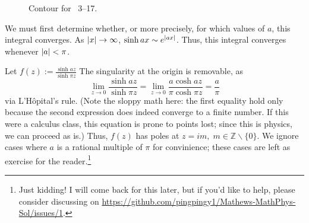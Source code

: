 \item

\begin{figure}[h]
	\centering
	\caption{Contour for ~3--17.}%
	\label{fig:problem3-17}
\end{figure}

We must first determine whether, or more precisely, for which values of $a$, this integral converges.
As $\left| x \right| \rightarrow \infty$, $\sinh ax \sim e^{\left| ax \right|}$.
Thus, this integral converges whenever $\left| a \right| < \pi$.

Let $f(z) := \frac{\sinh az}{\sinh \pi z}$
The singularity at the origin is removable, as
\[
    \lim_{z \rightarrow 0} \frac{\sinh az}{\sinh \pi z}
    = \lim_{z \rightarrow 0} \frac{a \cosh az}{\pi \cosh \pi z}
    = \frac{a}{\pi}
\]
via L'H\^opital's rule.
(Note the sloppy math here:
the first equality hold only because the second expression does indeed converge to a finite number.
If this were a calculus class, this equation is prone to points lost;
since this is physics, we can proceed as is.)
Thus, $f(z)$ has poles at $z = im,\; m \in \mathbb{Z} \backslash \{0\}$.
We ignore cases where $a$ is a rational multiple of $\pi$ for convinience;
these cases are left as exercise for the reader.\footnote{
Just kidding!
I will come back for this later, but if you'd like to help,
please consider discussing on \url{https://github.com/pingpingy1/Mathews-MathPhys-Sol/issues/1}.
}

